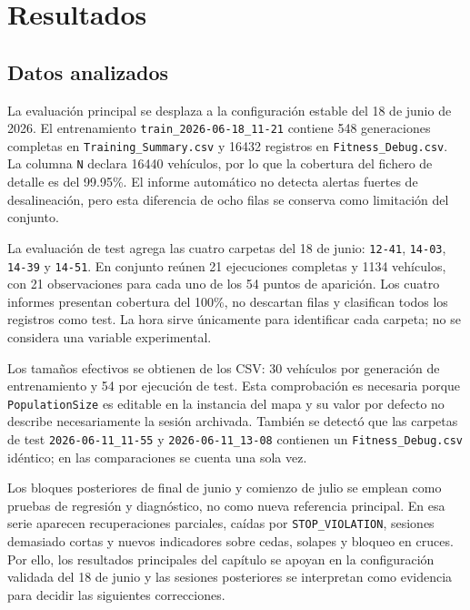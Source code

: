 \chapter{Resultados}

\section{Datos analizados}

La evaluación principal se desplaza a la configuración estable del 18 de junio de 2026. El entrenamiento \texttt{train\_2026-06-18\_11-21} contiene 548 generaciones completas en \texttt{Training\_Summary.csv} y 16432 registros en \texttt{Fitness\_Debug.csv}. La columna \texttt{N} declara 16440 vehículos, por lo que la cobertura del fichero de detalle es del 99.95\%. El informe automático no detecta alertas fuertes de desalineación, pero esta diferencia de ocho filas se conserva como limitación del conjunto.

La evaluación de test agrega las cuatro carpetas del 18 de junio: \texttt{12-41}, \texttt{14-03}, \texttt{14-39} y \texttt{14-51}. En conjunto reúnen 21 ejecuciones completas y 1134 vehículos, con 21 observaciones para cada uno de los 54 puntos de aparición. Los cuatro informes presentan cobertura del 100\%, no descartan filas y clasifican todos los registros como test. La hora sirve únicamente para identificar cada carpeta; no se considera una variable experimental.

Los tamaños efectivos se obtienen de los CSV: 30 vehículos por generación de entrenamiento y 54 por ejecución de test. Esta comprobación es necesaria porque \texttt{PopulationSize} es editable en la instancia del mapa y su valor por defecto no describe necesariamente la sesión archivada. También se detectó que las carpetas de test \texttt{2026-06-11\_11-55} y \texttt{2026-06-11\_13-08} contienen un \texttt{Fitness\_Debug.csv} idéntico; en las comparaciones se cuenta una sola vez.

Los bloques posteriores de final de junio y comienzo de julio se emplean como pruebas de regresión y diagnóstico, no como nueva referencia principal. En esa serie aparecen recuperaciones parciales, caídas por \texttt{STOP\_VIOLATION}, sesiones demasiado cortas y nuevos indicadores sobre cedas, solapes y bloqueo en cruces. Por ello, los resultados principales del capítulo se apoyan en la configuración validada del 18 de junio y las sesiones posteriores se interpretan como evidencia para decidir las siguientes correcciones.

